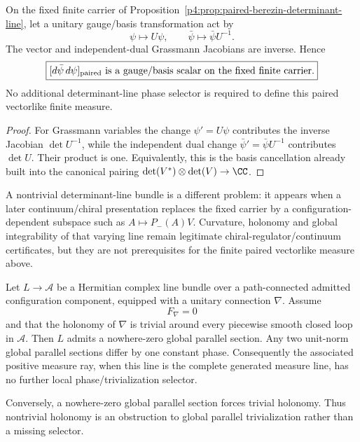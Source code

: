 \documentclass[12pt,a4paper]{article}
\begin{document}
\begin{corollary}
\label{p4:cor:v489-fixed-carrier-gauge-jacobian-cancellation}
On the fixed finite carrier of Proposition~\ref{p4:prop:paired-berezin-determinant-line},
let a unitary gauge/basis transformation act by
\[
 \psi\mapsto U\psi,
 \qquad
 \bar\psi\mapsto \bar\psi U^{-1}.
\]
The vector and independent-dual Grassmann Jacobians are inverse.  Hence
\[
 \boxed{[d\bar\psi\,d\psi]_{\rm paired}
 \ \text{is a gauge/basis scalar on the fixed finite carrier}.}
\]
No additional determinant-line phase selector is required to define this
paired vectorlike finite measure.
\end{corollary}
\begin{proof}
For Grassmann variables the change \(\psi'=U\psi\) contributes the inverse
Jacobian \(\det U^{-1}\), while the independent dual change
\(\bar\psi'=\bar\psi U^{-1}\) contributes \(\det U\).  Their product is one.
Equivalently, this is the basis cancellation already built into the canonical
pairing \(\det(V^*)\otimes\det(V)\to\CC\).
\end{proof}

\begin{remark}
\label{p4:rem:v489-fixed-versus-chiral-line}
A nontrivial determinant-line bundle is a different problem: it appears when a
later continuum/chiral presentation replaces the fixed carrier by a
configuration-dependent subspace such as \(A\mapsto P_-(A)V\).  Curvature,
holonomy and global integrability of that varying line remain legitimate
chiral-regulator/continuum certificates, but they are not prerequisites for
the finite paired vectorlike measure above.
\end{remark}

\begin{theorem}
\label{p4:thm:parallel-line-trivialization}
Let $L\to\mathcal A$ be a Hermitian complex line bundle over a path-connected
admitted configuration component, equipped with a unitary connection $\nabla$.
Assume
\[
 F_\nabla=0
\]
and that the holonomy of $\nabla$ is trivial around every piecewise smooth
closed loop in $\mathcal A$.  Then $L$ admits a nowhere-zero global parallel
section.  Any two unit-norm global parallel sections differ by one constant
phase.  Consequently the associated positive measure ray, when this line is
the complete generated measure line, has no further local phase/trivialization
selector.

Conversely, a nowhere-zero global parallel section forces trivial holonomy.
Thus nontrivial holonomy is an obstruction to global parallel
trivialization rather than a missing selector.
\end{theorem}
\end{document}
